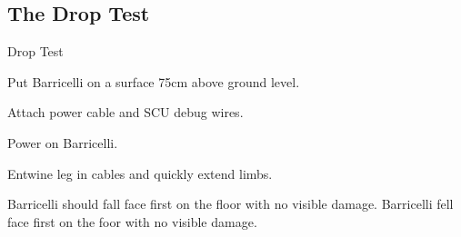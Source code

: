 \subsection{The Drop Test}

\test
{Drop Test}{
    \item{Put Barricelli on a surface 75cm above ground level.}
    \item{Attach power cable and SCU debug wires.}
    \item{Power on Barricelli.}
    \item{Entwine leg in cables and quickly extend limbs.}
}{Barricelli should fall face first on the floor with no visible damage.}
{Barricelli fell face first on the foor with no visible damage.}




